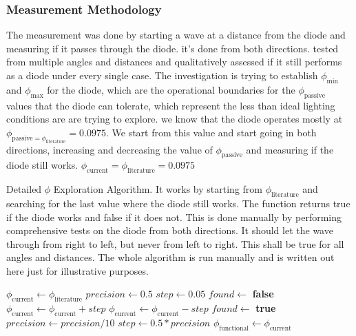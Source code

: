 \subsubsection*{Measurement Methodology}
The measurement was done by starting a wave at a distance from the diode and measuring if it passes through the diode. 
it's done from both directions.
tested from multiple angles and distances and qualitatively assessed if it still performs as a diode under every single case.
The investigation is trying to establish $\phi_{\text{min}}$ and $\phi_{\text{max}}$ for the diode, which are the operational boundaries for the $\phi_{\text{passive}}$ values that the diode can tolerate, 
which represent the less than ideal lighting conditions are are trying to explore.
we know that the diode operates mostly at $\phi_{\text{passive} = \phi_{\text{literature}}} = 0.0975$. 
We start from this value and start going in both directions, increasing and decreasing the value of $\phi_{\text{passive}}$ and measuring if the diode still works.
$\phi_{\text{current}} = \phi_{\text{literature}} = 0.0975$
\begin{algorithm}
    \caption{Detailed $\phi$ Exploration Algorithm. It works by starting from $\phi_{\text{literature}}$ and searching for the last value where the diode still works. 
    The function  returns true if the diode works and false if it does not. This is done manually by performing comprehensive tests on the diode from both directions. 
    It should let the wave through from right to left, but never from left to right. This shall be true for all angles and distances.
    The whole algorithm is run manually and is written out here just for illustrative purposes.}
    \label{alg:phi-exploration}
    \begin{algorithmic}[1]
        \State $\phi_{\text{current}} \leftarrow \phi_{\text{literature}}$
        \State $precision \leftarrow 0.5$ 
        \State $step \leftarrow 0.05$ 
         
            \State $found \leftarrow$ \textbf{false}
                    \State $\phi_{\text{current}} \leftarrow \phi_{\text{current}} + step$
                    \State $\phi_{\text{current}} \leftarrow \phi_{\text{current}} - step$
                \Else
                    \State $found \leftarrow$ \textbf{true}
                \EndIf
            \EndWhile
            \State $precision \leftarrow precision / 10$ 
            \State $step \leftarrow 0.5 * precision$ 
        \EndWhile
        \State $\phi_{\text{functional}} \leftarrow \phi_{\text{current}}$
    \end{algorithmic}
\end{algorithm}


